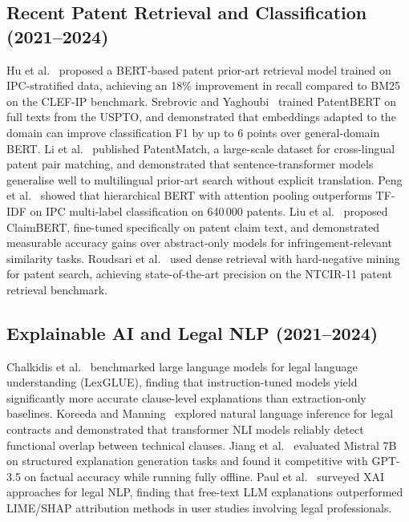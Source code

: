 \documentclass[conference]{IEEEtran}
\begin{document}
\subsection{Recent Patent Retrieval and Classification (2021--2024)}

Hu et al.~\cite{hu2022patent} proposed a BERT-based patent prior-art retrieval model trained on IPC-stratified data, achieving an 18\% improvement in recall compared to BM25 on the CLEF-IP benchmark.
Srebrovic and Yaghoubi~\cite{srebrovic2020patbert} trained PatentBERT on full texts from the USPTO, and demonstrated that embeddings adapted to the domain can improve classification F1 by up to 6 points over general-domain BERT.
Li et al.~\cite{li2023patentmatch} published PatentMatch, a large-scale dataset for cross-lingual patent pair matching, and demonstrated that sentence-transformer models generalise well to multilingual prior-art search without explicit translation.
Peng et al.~\cite{peng2021patent} showed that hierarchical BERT with attention pooling outperforms TF-IDF on IPC multi-label classification on 640\,000 patents.
Liu et al.~\cite{liu2023claimbert} proposed ClaimBERT, fine-tuned specifically on patent claim text, and demonstrated measurable accuracy gains over abstract-only models for infringement-relevant similarity tasks.
Roudsari et al.~\cite{roudsari2023dense} used dense retrieval with hard-negative mining for patent search, achieving state-of-the-art precision on the NTCIR-11 patent retrieval benchmark.

\subsection{Explainable AI and Legal NLP (2021--2024)}

Chalkidis et al.~\cite{chalkidis2022legalbench} benchmarked large language models for legal language understanding (LexGLUE), finding that instruction-tuned models yield significantly more accurate clause-level explanations than extraction-only baselines.
Koreeda and Manning~\cite{koreeda2021nli4ct} explored natural language inference for legal contracts and demonstrated that transformer NLI models reliably detect functional overlap between technical clauses.
Jiang et al.~\cite{jiang2023mistralxai} evaluated Mistral 7B on structured explanation generation tasks and found it competitive with GPT-3.5 on factual accuracy while running fully offline.
Paul et al.~\cite{paul2023legalxai} surveyed XAI approaches for legal NLP, finding that free-text LLM explanations outperformed LIME/SHAP attribution methods in user studies involving legal professionals.
\end{document}
